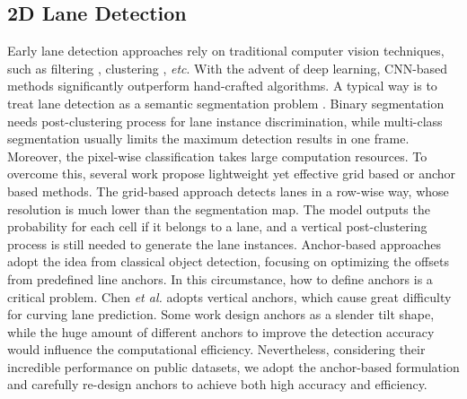 \documentclass[runningheads]{llncs}
\begin{document}
\subsection{2D Lane Detection}\label{sec: sup - related work}








Early lane detection approaches rely on traditional computer vision techniques, such as filtering \cite{aly2008real,li2016road}, clustering \cite{wang2014approach}, \textit{etc}. With the advent of deep learning, CNN-based methods significantly outperform hand-crafted algorithms.
A typical way is to treat lane detection as a semantic segmentation problem \cite{lee2017vpgnet,pan2018spatial,neven2018towards,hou2019learning,abualsaud2021laneaf}. Binary segmentation \cite{neven2018towards} needs post-clustering process for lane instance discrimination, while multi-class segmentation \cite{lee2017vpgnet,pan2018spatial,hou2019learning} usually limits the maximum detection results in one frame. Moreover, the pixel-wise classification takes large computation resources.
To overcome this, several work propose lightweight yet effective grid based \cite{qin2020ultra,liu2021condlanenet,jayasinghe2021swiftlane,qu2021focus} or anchor based \cite{chen2019pointlanenet,li2019line,xu2020curvelane,su2021structure,tabelini2021keep} methods.
The grid-based approach detects lanes in a row-wise way, whose resolution is much lower than the segmentation map. The model outputs the probability for each cell if it belongs to a lane, and a vertical post-clustering process is still needed to generate the lane instances.
Anchor-based approaches adopt the idea from classical object detection, focusing on optimizing the offsets from predefined line anchors. 
In this circumstance, how to define anchors is a critical problem. Chen \textit{et al.} \cite{chen2019pointlanenet} adopts vertical anchors, which cause great difficulty for curving lane prediction. Some work \cite{li2019line,tabelini2021keep,su2021structure} design anchors as 
a slender tilt shape, while the huge amount of different anchors to improve the detection accuracy would influence the computational efficiency. 
Nevertheless, considering their incredible performance on public datasets, we adopt the anchor-based formulation and carefully re-design anchors to achieve both high accuracy and efficiency.
\end{document}
